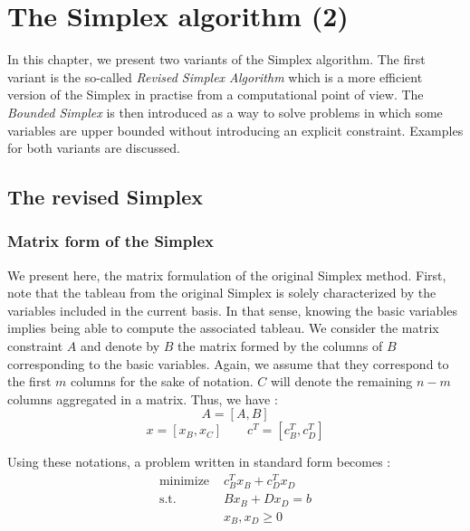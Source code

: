\chapter{The Simplex algorithm (2)}

In this chapter, we present two variants of the Simplex algorithm. The first variant is the so-called \textit{Revised Simplex Algorithm} which is a more efficient version of the Simplex in practise from a computational point of view. The \textit{Bounded Simplex} is then introduced as a way to solve problems in which some variables are upper bounded without introducing an explicit constraint. Examples for both variants are discussed. 

\section{The revised Simplex}
\subsection{Matrix form of the Simplex}

We present here, the matrix formulation of the original Simplex method. First, note that the tableau from the original Simplex is solely characterized by the variables included in the current basis. In that sense, knowing the basic variables implies being able to compute the associated tableau. We consider the matrix constraint $A$ and denote by $B$ the matrix formed by the columns of $B$ corresponding to the basic variables. Again, we assume that they correspond to the first $m$ columns for the sake of notation. $C$ will denote the remaining $n-m$ columns aggregated in a matrix. Thus, we have :
\[ A = [A, B] \]
\[ x = [x_B, x_C] \qquad c^T = [c_B^T, c_D^T] \]

Using these notations, a problem written in standard form becomes :
\begin{align*}
    \textrm{minimize } & c_B^Tx_B + c_D^Tx_D\\
    \textrm{s.t. } & Bx_B + Dx_D = b\\
    & x_B, x_D\ge 0
\end{align*}

